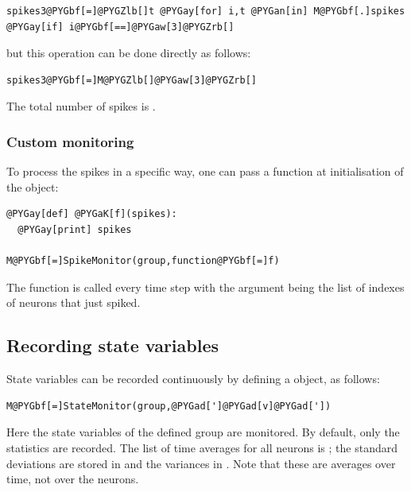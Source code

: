\documentclass[letterpaper,10pt,english]{manual}
\begin{document}
\begin{Verbatim}[commandchars=@\[\]]
spikes3@PYGbf[=]@PYGZlb[]t @PYGay[for] i,t @PYGan[in] M@PYGbf[.]spikes @PYGay[if] i@PYGbf[==]@PYGaw[3]@PYGZrb[]
\end{Verbatim}

but this operation can be done directly as follows:

\begin{Verbatim}[commandchars=@\[\]]
spikes3@PYGbf[=]M@PYGZlb[]@PYGaw[3]@PYGZrb[]
\end{Verbatim}

The total number of spikes is .


\subsubsection{Custom monitoring}

To process the spikes in a specific way, one can pass a function at initialisation of the
\hyperlink{brian.SpikeMonitor}{} object:

\begin{Verbatim}[commandchars=@\[\]]
@PYGay[def] @PYGaK[f](spikes):
  @PYGay[print] spikes

M@PYGbf[=]SpikeMonitor(group,function@PYGbf[=]f)
\end{Verbatim}

The function  is called every time step with the argument  being the list of
indexes of neurons that just spiked.


\subsection{Recording state variables}

State variables can be recorded continuously by defining a \hyperlink{brian.StateMonitor}{} object, as follows:

\begin{Verbatim}[commandchars=@\[\]]
M@PYGbf[=]StateMonitor(group,@PYGad[']@PYGad[v]@PYGad['])
\end{Verbatim}

Here the state variables  of the defined group are monitored. By default, only the statistics
are recorded. The list of time averages for all neurons is ; the standard deviations are stored
in  and the variances in . Note that these are averages over time, not over the neurons.
\end{document}
